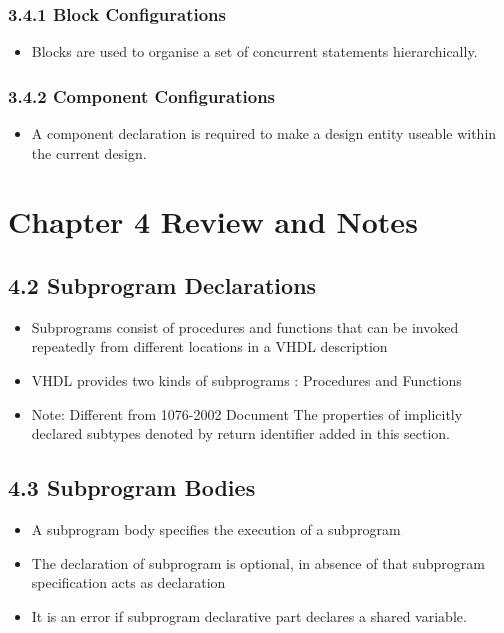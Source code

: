 \documentclass[a4paper,12pt]{article}
\begin{document}
	\subsubsection*{3.4.1 Block Configurations}
	\begin{itemize}[noitemsep]
		\item Blocks are used to organise a set of concurrent statements hierarchically.
	\end{itemize}
	
	\subsubsection*{3.4.2 Component Configurations}
	\begin{itemize}
		\item A component declaration is required to make a design entity useable within the current design.
	\end{itemize}
	
	\section*{Chapter 4 Review and Notes}
	\subsection*{4.2 Subprogram Declarations}
	\begin{itemize}
		\item Subprograms consist of procedures and functions that can be invoked repeatedly from different locations in a VHDL description
		\item VHDL provides two kinds of subprograms : Procedures and Functions
		\item Note: Different from 1076-2002 Document The properties of implicitly declared subtypes denoted by return identifier added in this section.
	\end{itemize}
	
	\subsection*{4.3 Subprogram Bodies}
	\begin{itemize}
		\item A subprogram body specifies the execution of a subprogram
		\item The declaration of subprogram is optional, in absence of that subprogram specification acts as declaration
		\item It is an error if subprogram declarative part declares a shared variable.
	\end{itemize}
	
\end{document}
